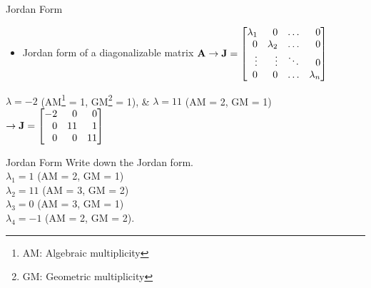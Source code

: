 \documentclass[aspectratio=169]{beamer}
\let\olditem\item
\renewcommand{\item}{\setlength{\itemsep}{\fill}\olditem}
\def\mf{\ensuremath\mathbf}
\def\bmx{\ensuremath\begin{bmatrix*}[r]}
\def\emx{\ensuremath\end{bmatrix*}}
\begin{document}
\begin{frame}{Jordan Form}
\begin{itemize}
    \item  Jordan form of a diagonalizable matrix $\mf{A} \rightarrow \mf{J} = \bmx
    \lambda_1 & 0 & \ldots & 0\\
    0 & \lambda_2 & \ldots & 0\\
    \vdots & \vdots & \ddots & 0\\
    0 & 0 & \ldots & \lambda_n
    \emx$
\end{itemize}

$\lambda = -2$ (AM\footnote{AM: Algebraic multiplicity} = 1, GM\footnote{GM: Geometric multiplicity} = 1), \& $\lambda = 11$ (AM = 2, GM = 1) $\rightarrow \mf{J} = \bmx
-2 & 0 & 0\\
0 & 11 & 1\\
0 & 0 & 11
\emx$
\end{frame}


\begin{frame}[t]{Jordan Form}
Write down the Jordan form.\\$\lambda_1 = 1$ (AM = 2, GM = 1)\\$\lambda_2 = 11$ (AM = 3, GM = 2)\\$\lambda_3 = 0$ (AM = 3, GM = 1)\\$\lambda_4 = -1$ (AM = 2, GM = 2).
\end{frame}
\end{document}
